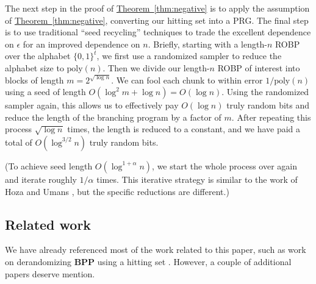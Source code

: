 \documentclass[11pt]{article}
\numberwithin{equation}{section}
\theoremstyle{definition}
\theoremstyle{plain}
\newcommand{\expref}[2]{\hyperref[#2]{#1~\ref{#2}}}
\begin{document}
The next step in the proof of \expref{Theorem}{thm:negative} is to apply the assumption of \expref{Theorem}{thm:negative}, converting our hitting set into a PRG. The final step is to use traditional ``seed recycling'' techniques to trade the excellent dependence on $\epsilon$ for an improved dependence on $n$. Briefly, starting with a length-$n$ ROBP over the alphabet $\{0, 1\}^t$, we first use a randomized sampler \cite{GW97} to reduce the alphabet size to $\text{poly}(n)$. Then we divide our length-$n$ ROBP of interest into blocks of length $m = 2^{\sqrt{\log n}}$. We can fool each chunk to within error $1/\text{poly}(n)$ using a seed of length $O(\log^2 m + \log n) = O(\log n)$. Using the randomized sampler again, this allows us to effectively pay $O(\log n)$ truly random bits and reduce the length of the branching program by a factor of $m$. After repeating this process $\sqrt{\log n}$ times, the length is reduced to a constant, and we have paid a total of $O(\log^{3/2} n)$ truly random bits.

(To achieve seed length $O(\log^{1 + \alpha} n)$, we start the whole process over again and iterate roughly $1/\alpha$ times. This iterative strategy is similar to the work of Hoza and Umans \cite{HU22}, but the specific reductions are different.)

\subsection{Related work}

We have already referenced most of the work related to this paper, such as work on derandomizing $\mathbf{BPP}$ using a hitting set \cite{ACR98, BF99, ACRT99, GVW11}. However, a couple of additional papers deserve mention.
\end{document}
